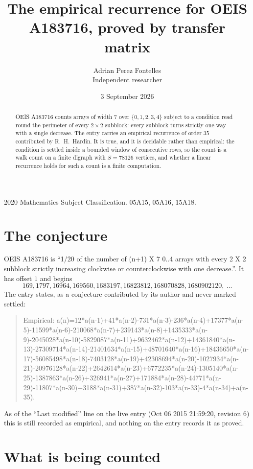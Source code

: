\documentclass[11pt,a4paper]{article}
\title{The empirical recurrence for OEIS A183716, proved by transfer matrix}
\author{Adrian Perez Fontelles\\ \small Independent researcher}
\date{3 September 2026}
\theoremstyle{plain}
\theoremstyle{definition}
\begin{document}
\maketitle

\begin{abstract}
OEIS A183716 counts arrays of width $7$ over $\{0,1,2,3,4\}$ subject to a condition read round the
perimeter of every $2\times2$ subblock: every subblock turns strictly one way with a single decrease. The entry carries an empirical recurrence of
order $35$ contributed by R.~H.~Hardin. It is true, and it is decidable rather than
empirical: the condition is settled inside a bounded window of consecutive rows, so the
count is a walk count on a finite digraph with $S=78126$ vertices, and whether a linear
recurrence holds for such a count is a finite computation.
\end{abstract}

\noindent\small 2020 Mathematics Subject Classification. 05A15, 05A16, 15A18.\normalsize

\section{The conjecture}

OEIS A183716 is ``1/20 of the number of (n+1) X 7 0..4 arrays with every 2 X 2 subblock strictly increasing clockwise or counterclockwise with one decrease.''. It has offset $1$ and begins
\[
169, 1797, 16964, 169560, 1683197, 16823812, 168070828, 1680902120,\ \dots
\]
The entry states, as a conjecture contributed by its author and never marked settled:
\begin{quote}
Empirical: a(n)=12*a(n-1)+41*a(n-2)-731*a(n-3)-236*a(n-4)+17377*a(n-5)-11599*a(n-6)-210068*a(n-7)+239143*a(n-8)+1435333*a(n-9)-2045028*a(n-10)-5829087*a(n-11)+9632462*a(n-12)+14361840*a(n-13)-27309714*a(n-14)-21401634*a(n-15)+48701640*a(n-16)+18436650*a(n-17)-56085498*a(n-18)-7403128*a(n-19)+42308694*a(n-20)-1027934*a(n-21)-20976128*a(n-22)+2642614*a(n-23)+6772235*a(n-24)-1305140*a(n-25)-1387863*a(n-26)+326941*a(n-27)+171884*a(n-28)-44771*a(n-29)-11807*a(n-30)+3188*a(n-31)+387*a(n-32)-103*a(n-33)-4*a(n-34)+a(n-35).
\end{quote}
As of the ``Last modified'' line on the live entry (Oct 06 2015 21:59:20, revision 6) this is still
recorded as empirical, and nothing on the entry records it as proved.

\section{What is being counted}
\end{document}
